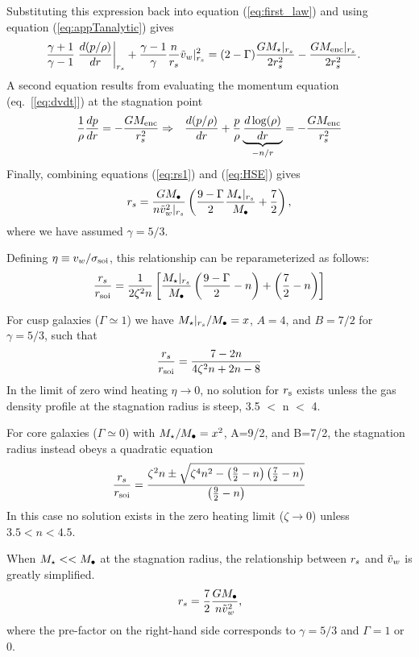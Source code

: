 Substituting this expression back into equation (\ref{eq:first_law}) and using equation (\ref{eq:appTanalytic}) gives
\begin{align}
&\frac{\gamma+1}{\gamma-1}
\left.\frac{d (p/\rho)}{d r}\right|_{r_s}+ \frac{\gamma-1}{\gamma} \frac{n}{r_s} \tilde{v}_{w}|_{r_s}^{2} = (2-\Gamma) \frac{G
  M_{\star}|_{r_s}}{2 r_s^2} -\frac{G M_{\rm enc}|_{r_s}}{2 r_s^2}.  \label{eq:rs1}
\end{align}
A second equation results from evaluating the momentum equation (eq.~[\ref{eq:dvdt}]) at the stagnation point
\begin{align}
&\frac{1}{\rho}\frac{d p}{d r}=- \frac{GM_{\rm enc}}{r_s^2} \Rightarrow
&\frac{d (p/\rho)}{d r}+\frac{p}{\rho}
\underbrace{\frac{d\log(\rho)}{dr}}_{-n/r} = -\frac{G M_{\rm enc}}{r_s^2} \label{eq:HSE}
\end{align}
Finally, combining equations (\ref{eq:rs1}) and (\ref{eq:HSE}) gives 
\begin{align}
r_s=\frac{G M_{\bullet}}{n \tilde{v}_{w}^{2}|_{r_s}}\left(\frac{9-\Gamma}{2} \frac{M_{\star}|_{r_s}}{M_{\bullet}} +\frac{7}{2}\right),
\label{eq:rs2main}
\end{align}
where we have assumed $\gamma=5/3$.

Defining $\eta \equiv v_{w}/\sigma_{\rm soi}$, this relationship can be reparameterized as follows:
\begin{align}
  \frac{r_s}{r_{\rm soi}}=\frac{1}{2 \zeta^2 n}\left[
   \frac{M_{\star}|_{r_s}}{M_{\bullet}}\left(\frac{9-\Gamma}{2}-n\right)+\left(\frac{7}{2}-n\right)\right]
\end{align}

For cusp galaxies ($\Gamma\simeq1$) we have $M_{\star}|_{r_s}/M_{\bullet}=x$, $A=4$, and $B=7/2$ for $\gamma = 5/3$, such that 
\begin{align}
\frac{r_s}{r_{\rm soi}}=\frac{7-2n}{4\zeta^2 n+2n-8}
\end{align}
In the limit of zero wind heating $\eta \rightarrow 0$, no solution for $r_{\rm s}$ exists unless the gas density profile at the stagnation radius is steep, 3.5 $<$ n $<$ 4.  

For core galaxies ($\Gamma \simeq 0$) with $M_{\star}/M_{\bullet}=x^2$, A=9/2,
and B=7/2, the stagnation radius instead obeys a quadratic equation
\begin{align}
\frac{r_s}{r_{\rm soi}}=\frac{\zeta^2 n \pm \sqrt{\zeta^4 n^2 - \left(\frac{9}{2}-n\right)
    \left(\frac{7}{2}-n\right)}}{\left(\frac{9}{2}-n\right)}
\label{eq:rstag}
\end{align}
In this case no solution exists in the zero heating limit ($\zeta \rightarrow 0$) unless $3.5<n<4.5$.

When $M_{\star} << M_{\bullet}$ at the stagnation radius, the relationship between $r_s$ and $\tilde{v}_{w}$ is greatly simplified. 
\begin{align}
r_s=\frac{7}{2}\frac{G M_{\bullet}}{n \tilde{v}_{w}^2},
\end{align}
where the pre-factor on the right-hand side corresponds to
$\gamma=5/3$ and $\Gamma=1$ or 0.  



